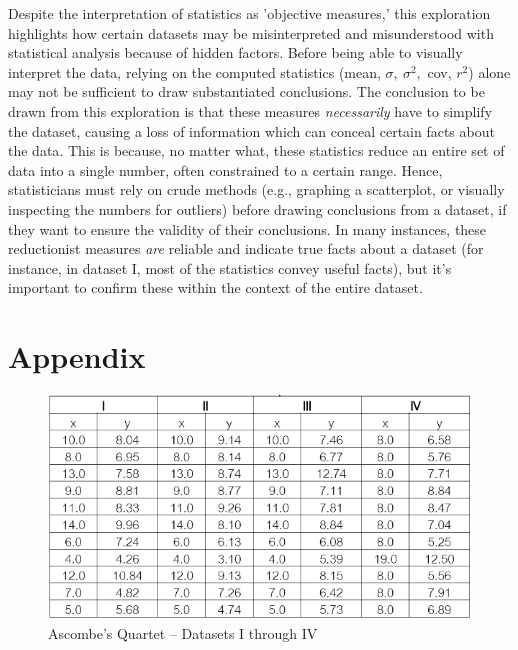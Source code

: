 \documentclass[11pt,a4paper]{article}
\begin{document}
Despite the interpretation of statistics as 'objective measures,' this exploration highlights how certain datasets may be misinterpreted and misunderstood with statistical analysis because of hidden factors. Before being able to visually interpret the data, relying on the computed statistics (mean, $\sigma,\ \sigma^2,$ cov, $r^2$) alone may not be sufficient to draw substantiated conclusions. The conclusion to be drawn from this exploration is that these measures \textit{necessarily} have to simplify the dataset, causing a loss of information which can conceal certain facts about the data. This is because, no matter what, these statistics reduce an entire set of data into a single number, often constrained to a certain range. Hence, statisticians must rely on crude methods (e.g., graphing a scatterplot, or visually inspecting the numbers for outliers) before drawing conclusions from a dataset, if they want to ensure the validity of their conclusions. In many instances, these reductionist measures \textit{are} reliable and indicate true facts about a dataset (for instance, in dataset I, most of the statistics convey useful facts), but it's important to confirm these within the context of the entire dataset.

\section{Appendix} \label{Appendix}

\begin{figure}[h]
\begin{center}
\includegraphics[scale=.65]{datatable} 
\caption{Ascombe's Quartet -- Datasets I through IV}
\label{fig:datas}
\end{center}
\end{figure}
\end{document}
